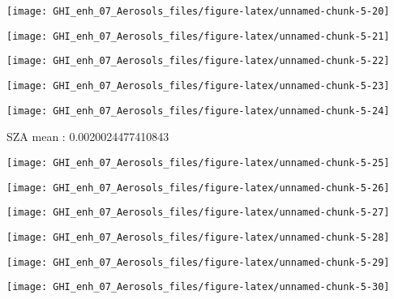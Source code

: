 \documentclass[
  10pt,
  a4paper,oneside]{article}
\begin{document}
\begin{center}\texttt{[image: GHI\_enh\_07\_Aerosols\_files/figure-latex/unnamed-chunk-5-20]} \end{center}

\begin{center}\texttt{[image: GHI\_enh\_07\_Aerosols\_files/figure-latex/unnamed-chunk-5-21]} \end{center}

\begin{center}\texttt{[image: GHI\_enh\_07\_Aerosols\_files/figure-latex/unnamed-chunk-5-22]} \end{center}

\begin{center}\texttt{[image: GHI\_enh\_07\_Aerosols\_files/figure-latex/unnamed-chunk-5-23]} \end{center}

\begin{center}\texttt{[image: GHI\_enh\_07\_Aerosols\_files/figure-latex/unnamed-chunk-5-24]} \end{center}

SZA mean : 0.0020024477410843

\begin{center}\texttt{[image: GHI\_enh\_07\_Aerosols\_files/figure-latex/unnamed-chunk-5-25]} \end{center}

\begin{center}\texttt{[image: GHI\_enh\_07\_Aerosols\_files/figure-latex/unnamed-chunk-5-26]} \end{center}

\begin{center}\texttt{[image: GHI\_enh\_07\_Aerosols\_files/figure-latex/unnamed-chunk-5-27]} \end{center}

\begin{center}\texttt{[image: GHI\_enh\_07\_Aerosols\_files/figure-latex/unnamed-chunk-5-28]} \end{center}

\begin{center}\texttt{[image: GHI\_enh\_07\_Aerosols\_files/figure-latex/unnamed-chunk-5-29]} \end{center}

\begin{center}\texttt{[image: GHI\_enh\_07\_Aerosols\_files/figure-latex/unnamed-chunk-5-30]} \end{center}
\end{document}
